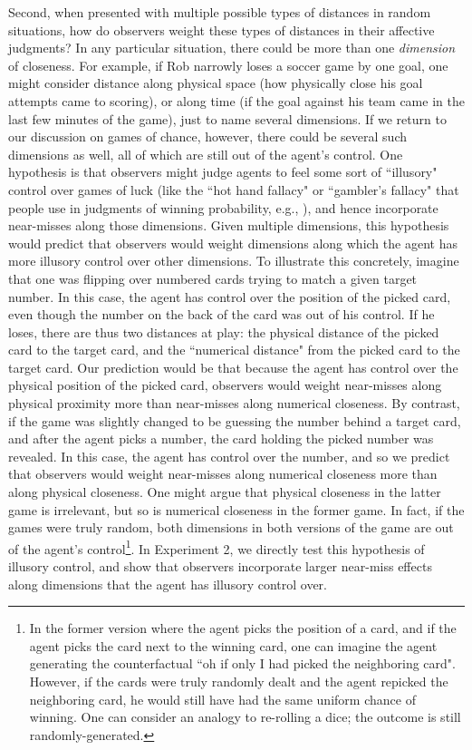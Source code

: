 \documentclass[10pt,letterpaper]{article}
\begin{document}
	Second, when presented with multiple possible types of distances in random situations, how do observers weight these types of distances in their affective judgments? In any particular situation, there could be more than one \textit{dimension} of closeness. For example, if Rob narrowly loses a soccer game by one goal, one might consider distance along physical space (how physically close his goal attempts came to scoring), or along time (if the goal against his team came in the last few minutes of the game), just to name several dimensions. If we return to our discussion on games of chance, however, there could be several such dimensions as well, all of which are still out of the agent's control. One hypothesis is that observers might judge agents to feel some sort of ``illusory" control over games of luck (like the ``hot hand fallacy" or ``gambler's fallacy" that people use in judgments of winning probability, e.g., ), and hence incorporate near-misses along those dimensions. Given multiple dimensions, this hypothesis would predict that observers would weight dimensions along which the agent has more illusory control over other dimensions. To illustrate this concretely, imagine that one was flipping over numbered cards trying to match a given target number. In this case, the agent has control over the position of the picked card, even though the number on the back of the card was out of his control. If he loses, there are thus two distances at play: the physical distance of the picked card to the target card, and the ``numerical distance" from the picked card to the target card. Our prediction would be that because the agent has control over the physical position of the picked card, observers would weight near-misses along physical proximity more than near-misses along numerical closeness. By contrast, if the game was slightly changed to be guessing the number behind a target card, and after the agent picks a number, the card holding the picked number was revealed. In this case, the agent has control over the number, and so we predict that observers would weight near-misses along numerical closeness more than along physical closeness. One might argue that physical closeness in the latter game is irrelevant, but so is numerical closeness in the former game. In fact, if the games were truly random, both dimensions in both versions of the game are out of the agent's control\footnote{In the former version where the agent picks the position of a card, and if the agent picks the card next to the winning card, one can imagine the agent generating the counterfactual ``oh if only I had picked the neighboring card". However, if the cards were truly randomly dealt and the agent repicked the neighboring card, he would still have had the same uniform chance of winning. One can consider an analogy to re-rolling a dice; the outcome is still randomly-generated.}. In Experiment 2, we directly test this hypothesis of illusory control, and show that observers incorporate larger near-miss effects along dimensions that the agent has illusory control over.
\end{document}
